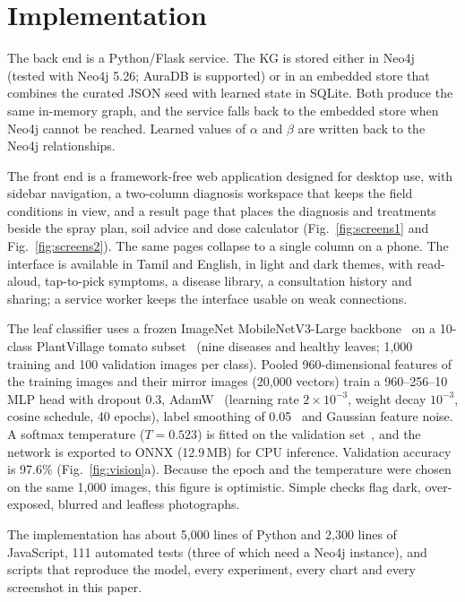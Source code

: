 \documentclass[conference]{IEEEtran}
\begin{document}
\section{Implementation}
\label{sec:impl}

The back end is a Python/Flask service. The KG is stored either in Neo4j~\cite{neo4j} (tested with Neo4j 5.26; AuraDB is supported) or in an embedded store that combines the curated JSON seed with learned state in SQLite. Both produce the same in-memory graph, and the service falls back to the embedded store when Neo4j cannot be reached. Learned values of $\alpha$ and $\beta$ are written back to the Neo4j relationships.

The front end is a framework-free web application designed for desktop use, with sidebar navigation, a two-column diagnosis workspace that keeps the field conditions in view, and a result page that places the diagnosis and treatments beside the spray plan, soil advice and dose calculator (Fig.~\ref{fig:screens1} and Fig.~\ref{fig:screens2}). The same pages collapse to a single column on a phone. The interface is available in Tamil and English, in light and dark themes, with read-aloud, tap-to-pick symptoms, a disease library, a consultation history and sharing; a service worker keeps the interface usable on weak connections.

The leaf classifier uses a frozen ImageNet MobileNetV3-Large backbone~\cite{howard2019} on a 10-class PlantVillage tomato subset~\cite{hughes2015} (nine diseases and healthy leaves; 1,000 training and 100 validation images per class). Pooled 960-dimensional features of the training images and their mirror images (20,000 vectors) train a 960--256--10 MLP head with dropout 0.3, AdamW~\cite{loshchilov2019} (learning rate $2\times10^{-3}$, weight decay $10^{-3}$, cosine schedule, 40 epochs), label smoothing of 0.05~\cite{szegedy2016} and Gaussian feature noise. A softmax temperature ($T=0.523$) is fitted on the validation set~\cite{guo2017}, and the network is exported to ONNX (12.9\,MB) for CPU inference. Validation accuracy is 97.6\% (Fig.~\ref{fig:vision}a). Because the epoch and the temperature were chosen on the same 1,000 images, this figure is optimistic. Simple checks flag dark, over-exposed, blurred and leafless photographs.

The implementation has about 5,000 lines of Python and 2,300 lines of JavaScript, 111 automated tests (three of which need a Neo4j instance), and scripts that reproduce the model, every experiment, every chart and every screenshot in this paper.
\end{document}
